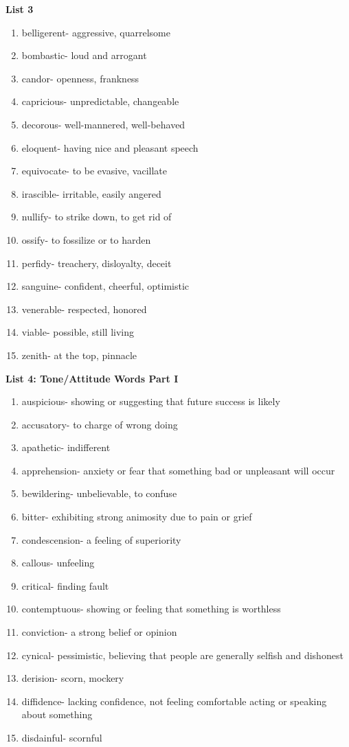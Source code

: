 \textbf{List 3}

\begin{enumerate}
\item belligerent- aggressive, quarrelsome 
\item bombastic- loud and arrogant
\item candor- openness, frankness
\item capricious- unpredictable, changeable
\item decorous- well-mannered, well-behaved
\item eloquent- having nice and pleasant speech
\item equivocate- to be evasive, vacillate
\item irascible- irritable, easily angered
\item nullify- to strike down, to get rid of
\item ossify- to fossilize or to harden
\item perfidy- treachery, disloyalty, deceit
\item sanguine- confident, cheerful, optimistic
\item venerable- respected, honored
\item viable- possible, still living
\item zenith- at the top, pinnacle
\end{enumerate}


\textbf{List 4: Tone/Attitude Words Part I}

\begin{enumerate}
\item auspicious- showing or suggesting that future success is likely
\item accusatory- to charge of wrong doing
\item apathetic- indifferent
\item apprehension- anxiety or fear that something bad or unpleasant will occur
\item bewildering- unbelievable, to confuse
\item bitter- exhibiting strong animosity due to pain or grief
\item condescension- a feeling of superiority
\item callous- unfeeling
\item critical- finding fault
\item contemptuous- showing or feeling that something is worthless
\item conviction- a strong belief or opinion
\item cynical- pessimistic, believing that people are generally selfish and dishonest
\item derision- scorn, mockery
\item diffidence- lacking confidence, not feeling comfortable acting or speaking about something
\item disdainful- scornful
\end{enumerate}

